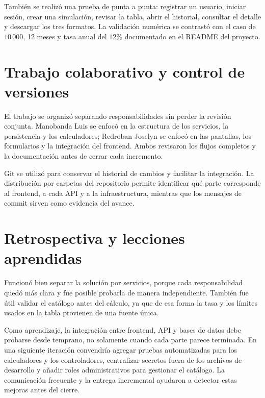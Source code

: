 \documentclass[12pt,a4paper]{article}
\begin{document}
También se realizó una prueba de punta a punta: registrar un usuario, iniciar
sesión, crear una simulación, revisar la tabla, abrir el historial, consultar
el detalle y descargar los tres formatos. La validación numérica se contrastó
con el caso de $10\,000$, 12 meses y tasa anual del $12\%$ documentado en el
README del proyecto.

\section{Trabajo colaborativo y control de versiones}

El trabajo se organizó separando responsabilidades sin perder la revisión
conjunta. Manobanda Luis se enfocó en la estructura de los servicios, la
persistencia y los calculadores; Redroban Joselyn se enfocó en las pantallas,
los formularios y la integración del frontend. Ambos revisaron los flujos
completos y la documentación antes de cerrar cada incremento.

Git se utilizó para conservar el historial de cambios y facilitar la
integración. La distribución por carpetas del repositorio permite identificar
qué parte corresponde al frontend, a cada API y a la infraestructura, mientras
que los mensajes de commit sirven como evidencia del avance.

\section{Retrospectiva y lecciones aprendidas}

Funcionó bien separar la solución por servicios, porque cada responsabilidad
quedó más clara y fue posible probarla de manera independiente. También fue
útil validar el catálogo antes del cálculo, ya que de esa forma la tasa y los
límites usados en la tabla provienen de una fuente única.

Como aprendizaje, la integración entre frontend, API y bases de datos debe
probarse desde temprano, no solamente cuando cada parte parece terminada. En
una siguiente iteración convendría agregar pruebas automatizadas para los
calculadores y los controladores, centralizar secretos fuera de los archivos
de desarrollo y añadir roles administrativos para gestionar el catálogo.
La comunicación frecuente y la entrega incremental ayudaron a detectar estas
mejoras antes del cierre.
\end{document}
